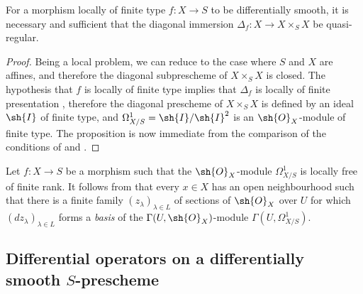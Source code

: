 \begin{proposition}[16.10.5]
\label{IV.16.10.5}
For a morphism locally of finite type $f:X \to S$ to be differentially smooth, it is necessary and sufficient that the diagonal immersion $\Delta_f:X \to X \times_S X$ be quasi-regular.
\end{proposition}
  

\begin{proof}
Being a local problem, we can reduce to the case where $S$ and $X$ are affines, and therefore the diagonal subprescheme of $X \times_S X$ is closed.
The hypothesis that $f$ is locally of finite type implies that $\Delta_f$ is locally of finite presentation , therefore the diagonal prescheme of $X \times_S X$ is defined by an ideal $\sh{I}$ of finite type, and $\Omega_{X/S}^1 = \sh{I}/\sh{I}^2$ is an $\sh{O}_X$-module of finite type.
The proposition is now immediate from the comparison of the conditions of  and . 
\end{proof}

\begin{remark}[16.10.6]
\label{IV.16.10.6}
Let $f:X \to S$ be a morphism such that the $\sh{O}_X$-module $\Omega_{X/S}^1$ is locally free of finite rank.
It follows from  that every $x \in X$ has an open neighbourhood such that there is a finite family $(z_\lambda)_{\lambda \in L}$ of sections of $\sh{O}_X$ over $U$ for which $(dz_\lambda)_{\lambda \in L}$ forms a \emph{basis} of the $\Gamma(U, \sh{O}_X)$-module $\Gamma(U, \Omega_{X/S}^1)$.
\end{remark}

\subsection{Differential operators on a differentially smooth $S$-prescheme}
\label{IV.16.11}

